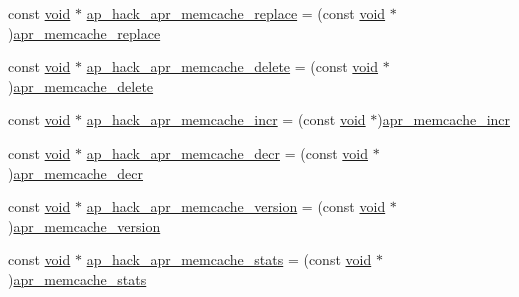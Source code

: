 \begin{DoxyCompactItemize}
\item 
const \hyperlink{group__MOD__ISAPI_gacd6cdbf73df3d9eed42fa493d9b621a6}{void} $\ast$ \hyperlink{srclib_2apr-util_2exports_8c_aa88c5544c1562711c2a5c4adebb878d0}{ap\+\_\+hack\+\_\+apr\+\_\+memcache\+\_\+replace} = (const \hyperlink{group__MOD__ISAPI_gacd6cdbf73df3d9eed42fa493d9b621a6}{void} $\ast$)\hyperlink{apr__memcache_8c_aca44dd2eb5fe519cd4eeb2f0489deb6e}{apr\+\_\+memcache\+\_\+replace}
\item 
const \hyperlink{group__MOD__ISAPI_gacd6cdbf73df3d9eed42fa493d9b621a6}{void} $\ast$ \hyperlink{srclib_2apr-util_2exports_8c_a86fdfade3dee03a9be05ff3a9f45ae80}{ap\+\_\+hack\+\_\+apr\+\_\+memcache\+\_\+delete} = (const \hyperlink{group__MOD__ISAPI_gacd6cdbf73df3d9eed42fa493d9b621a6}{void} $\ast$)\hyperlink{apr__memcache_8c_ab2df4b069b4ae0c009317cd07fd7aab9}{apr\+\_\+memcache\+\_\+delete}
\item 
const \hyperlink{group__MOD__ISAPI_gacd6cdbf73df3d9eed42fa493d9b621a6}{void} $\ast$ \hyperlink{srclib_2apr-util_2exports_8c_ad06b9c9cef4f0f3daed04e4a3677b0c3}{ap\+\_\+hack\+\_\+apr\+\_\+memcache\+\_\+incr} = (const \hyperlink{group__MOD__ISAPI_gacd6cdbf73df3d9eed42fa493d9b621a6}{void} $\ast$)\hyperlink{apr__memcache_8c_a753c640fdd85fbe82b98c81a2f1bcd46}{apr\+\_\+memcache\+\_\+incr}
\item 
const \hyperlink{group__MOD__ISAPI_gacd6cdbf73df3d9eed42fa493d9b621a6}{void} $\ast$ \hyperlink{srclib_2apr-util_2exports_8c_ae5d277cd5bc874e208e66ed72ac84ead}{ap\+\_\+hack\+\_\+apr\+\_\+memcache\+\_\+decr} = (const \hyperlink{group__MOD__ISAPI_gacd6cdbf73df3d9eed42fa493d9b621a6}{void} $\ast$)\hyperlink{apr__memcache_8c_ab61a88109cd1a3414b26360314287253}{apr\+\_\+memcache\+\_\+decr}
\item 
const \hyperlink{group__MOD__ISAPI_gacd6cdbf73df3d9eed42fa493d9b621a6}{void} $\ast$ \hyperlink{srclib_2apr-util_2exports_8c_a2962f2848a4b7d4dcb7c703c7c63781d}{ap\+\_\+hack\+\_\+apr\+\_\+memcache\+\_\+version} = (const \hyperlink{group__MOD__ISAPI_gacd6cdbf73df3d9eed42fa493d9b621a6}{void} $\ast$)\hyperlink{apr__memcache_8c_a13804900cd5f4453e79100c3356423d6}{apr\+\_\+memcache\+\_\+version}
\item 
const \hyperlink{group__MOD__ISAPI_gacd6cdbf73df3d9eed42fa493d9b621a6}{void} $\ast$ \hyperlink{srclib_2apr-util_2exports_8c_a8b36d4ea84c4858ac4c41cf7df8d86d3}{ap\+\_\+hack\+\_\+apr\+\_\+memcache\+\_\+stats} = (const \hyperlink{group__MOD__ISAPI_gacd6cdbf73df3d9eed42fa493d9b621a6}{void} $\ast$)\hyperlink{apr__memcache_8c_ae1757768fca909074ed5c044c3f1df6d}{apr\+\_\+memcache\+\_\+stats}

\end{DoxyCompactItemize}

